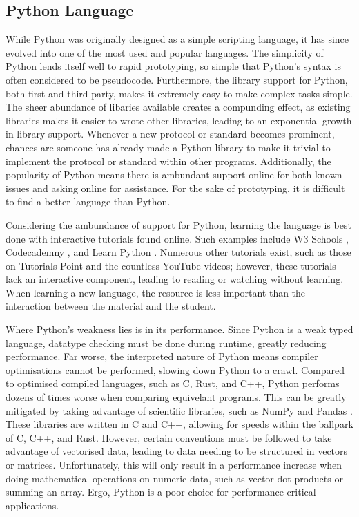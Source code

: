 \documentclass[11pt]{article}
\begin{document}
\subsection{Python Language}

While Python was originally designed as a simple scripting language, it has since evolved into one of the most used and popular languages. The simplicity of Python lends itself well to rapid prototyping, so simple that Python's syntax is often considered to be pseudocode. Furthermore, the library support for Python, both first and third-party, makes it extremely easy to make complex tasks simple. The sheer abundance of libaries available creates a compunding effect, as existing libraries makes it easier to wrote other libraries, leading to an exponential growth in library support. Whenever a new protocol or standard becomes prominent, chances are someone has already made a Python library to make it trivial to implement the protocol or standard within other programs. Additionally, the popularity of Python means there is ambundant support online for both known issues and asking online for assistance. For the sake of prototyping, it is difficult to find a better language than Python.

Considering the ambundance of support for Python, learning the language is best done with interactive tutorials found online. Such examples include W3 Schools \cite{w3-schools-python}, Codecademny \cite{codecademny-python}, and Learn Python \cite{learn-python}. Numerous other tutorials exist, such as those on Tutorials Point \cite{tutorials-point-python} and the countless YouTube videos; however, these tutorials lack an interactive component, leading to reading or watching without learning. When learning a new language, the resource is less important than the interaction between the material and the student.

Where Python's weakness lies is in its performance. Since Python is a weak typed language, datatype checking must be done during runtime, greatly reducing performance. Far worse, the interpreted nature of Python means compiler optimisations cannot be performed, slowing down Python to a crawl. Compared to optimised compiled languages, such as C, Rust, and C++, Python performs dozens of times worse when comparing equivelant programs. This can be greatly mitigated by taking advantage of scientific libraries, such as NumPy \cite{numpy} and Pandas \cite{panda}. These libraries are written in C and C++, allowing for speeds within the ballpark of C, C++, and Rust. However, certain conventions must be followed to take advantage of vectorised data, leading to data needing to be structured in vectors or matrices. Unfortunately, this will only result in a performance increase when doing mathematical operations on numeric data, such as vector dot products or summing an array. Ergo, Python is a poor choice for performance critical applications.
\end{document}
